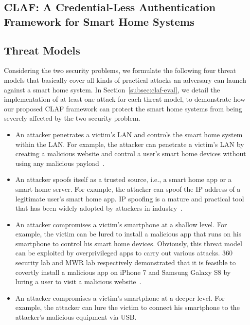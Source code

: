 \documentclass[letterpaper,12pt]{article}
\begin{document}
   \newpage
   \begin{singlespace}
   \section{CLAF: A Credential-Less Authentication Framework for Smart Home Systems}
   \end{singlespace}
   \label{sec:claf}
   
\subsection{Threat Models}
Considering the two security problems, we formulate the following four threat models that basically cover all kinds of practical attacks an adversary can launch against a smart home system. In Section~\ref{subsec:claf-eval}, we detail the implementation of at least one attack for each threat model, to demonstrate how our proposed CLAF framework can protect the smart home systems from being severely affected by the two security problem. 

\begin{itemize}
\item An attacker penetrates a victim's LAN and controls the smart home system within the LAN. 
For example, the attacker can penetrate a victim's LAN by creating a malicious website and control a user's smart home devices without using any malicious payload~\cite{jia2018traffic}. 

\item An attacker spoofs itself as a trusted source, i.e., a smart home app or a smart home server. For example, the attacker can spoof the IP address of a legitimate user's smart home app.  
IP spoofing is a mature and practical tool that has been widely adopted by attackers in industry~\cite{tanase2003ip}. 

\item An attacker compromises a victim's smartphone at a shallow level. For example, the victim can be lured to install a malicious app that runs on his smartphone to control his smart home devices. Obviously, this threat model can be exploited by overprivileged apps to carry out various attacks. 
360 security lab and MWR lab respectively demonstrated that it is feasible to covertly install a malicious app on iPhone 7 and Samsung Galaxy S8 by luring a user to visit a malicious website~\cite{pwn2own2017}. 

\item An attacker compromises a victim's smartphone at a deeper level. For example, the attacker can lure the victim to connect his smartphone to the attacker's malicious equipment via USB. %

\end{itemize}
\end{document}
